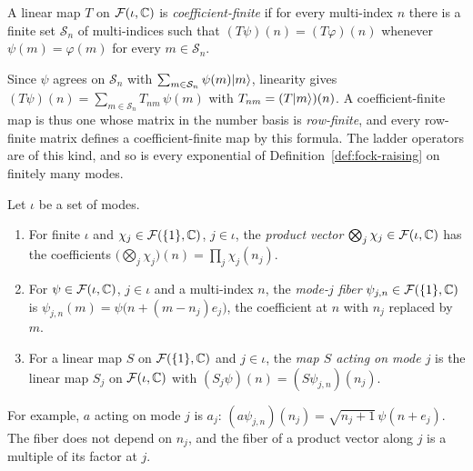 \begin{vetbenv}
\begin{definition}\label{def:fock-coefffinite}
A linear map $T$ on $\mathcal F(\iota,\mathbb C)$ is \emph{coefficient-finite} if for every multi-index $n$ there
is a finite set $\mathcal S_n$ of multi-indices such that $(T\psi)(n)=(T\varphi)(n)$ whenever
$\psi(m)=\varphi(m)$ for every $m\in\mathcal S_n$.
\end{definition}

Since $\psi$ agrees on $\mathcal S_n$ with $\sum_{m\in\mathcal S_n}\psi(m)\lvert m\rangle$, linearity gives
$(T\psi)(n)=\sum_{m\in\mathcal S_n}T_{nm}\,\psi(m)$ with $T_{nm}=(T\lvert m\rangle)(n)$. A coefficient-finite map
is thus one whose matrix in the number basis is \emph{row-finite}, and every row-finite matrix
defines a coefficient-finite map by this formula. The ladder operators are of this kind, and so is
every exponential of Definition~\ref{def:fock-raising} on finitely many modes.

\begin{definition}\label{def:fock-modes}
Let $\iota$ be a set of modes.
\begin{enumerate}
\item[(a)] For finite $\iota$ and $\chi_j\in\mathcal F(\{1\},\mathbb C)$, $j\in\iota$, the \emph{product vector}
$\bigotimes_j\chi_j\in\mathcal F(\iota,\mathbb C)$ has the coefficients $\bigl(\bigotimes_j\chi_j\bigr)(n)=\prod_j
\chi_j(n_j)$.
\item[(b)] For $\psi\in\mathcal F(\iota,\mathbb C)$, $j\in\iota$ and a multi-index $n$, the \emph{mode-$j$ fiber}
$\psi_{j,n}\in\mathcal F(\{1\},\mathbb C)$ is $\psi_{j,n}(m)=\psi\bigl(n+(m-n_j)e_j\bigr)$, the coefficient at $n$ with
$n_j$ replaced by $m$.
\item[(c)] For a linear map $S$ on $\mathcal F(\{1\},\mathbb C)$ and $j\in\iota$, the \emph{map $S$ acting on mode
$j$} is the linear map $S_j$ on $\mathcal F(\iota,\mathbb C)$ with $(S_j\psi)(n)=(S\psi_{j,n})(n_j)$.
\end{enumerate}
\end{definition}

For example, $a$ acting on mode $j$ is $a_j$: $(a\psi_{j,n})(n_j)=\sqrt{n_j+1}\,\psi(n+e_j)$. The fiber
does not depend on $n_j$, and the fiber of a product vector along $j$ is a multiple of its factor at
$j$.


\end{vetbenv}
